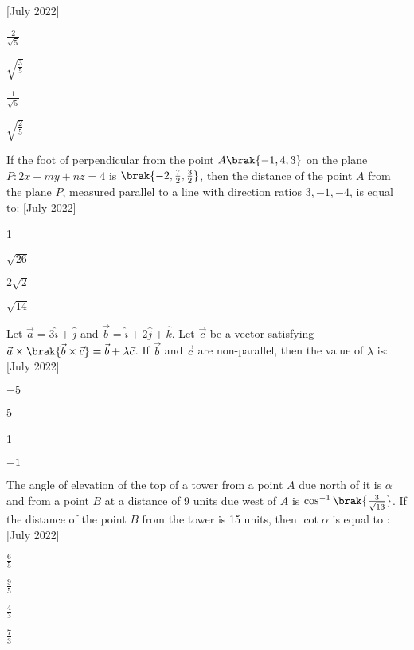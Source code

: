  \hfill [July 2022]
 \begin{enumerate}
     \begin{multicols}{4}
     \item $\frac{2}{\sqrt{5}}$
     \item $\sqrt{\frac{3}{5}}$
     \item $\frac{1}{\sqrt{5}}$
     \item $\sqrt{\frac{2}{5}}$
     \end{multicols}
 \end{enumerate}
 \item If the foot of perpendicular from the point $A\brak{-1,4,3}$ on the plane $P : 2x + my + nz = 4$ is $\brak{-2, \frac{7}{2}, \frac{3}{2}}$, then the distance of the point $A$ from the plane $P$, measured parallel to a line with direction ratios $3, -1, -4$, is equal to: \hfill[July 2022]
 \begin{enumerate}
     \begin{multicols}{2}
         \item 1
         \item $\sqrt{26}$
         \item $2\sqrt{2}$
         \item $\sqrt{14}$
     \end{multicols}
 \end{enumerate}
 \item Let $\vec{a} = 3\hat{i} + \hat{j}$ and $\vec{b} = \hat{i} + 2\hat{j} + \hat{k}$. Let $\vec{c}$ be a vector satisfying $\vec{a} \times \brak{\vec{b} \times \vec{c}} = \vec{b} + \lambda \vec{c}$. If $\vec{b}$ and $\vec{c}$ are non-parallel, then the value of $\lambda$ is: \hfill [July 2022]
 \begin{enumerate}
     \begin{multicols}{2}
         \item $-5$
         \item 5
         \item 1
         \item $-1$
     \end{multicols}
 \end{enumerate}
 \item The angle of elevation of the top of a tower from a point $A$ due north of it is $\alpha$ and from a point $B$ at a distance of 9 units due west of $A$ is $\cos^{-1}\brak{\frac{3}{\sqrt{13}}}$. If the distance of the point $B$ from the tower is 15 units, then $\cot{\alpha}$ is equal to : \hfill [July 2022]
 \begin{enumerate}
     \begin{multicols}{4}
         \item $\frac{6}{5}$
         \item $\frac{9}{5}$
         \item $\frac{4}{3}$
         \item $\frac{7}{3}$
     \end{multicols}
 \end{enumerate}
